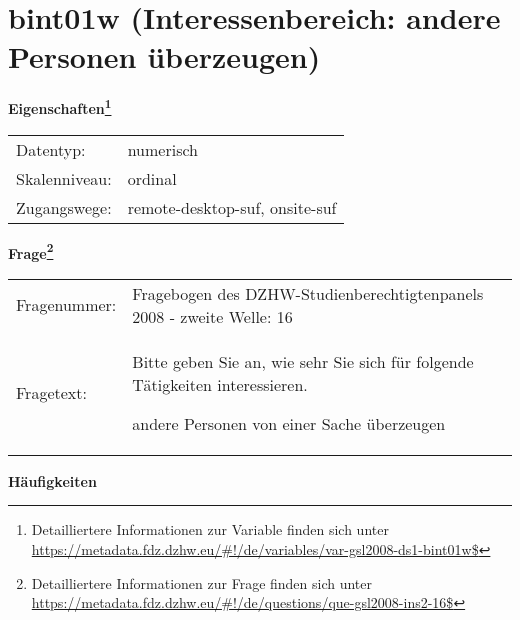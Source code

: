 
    \setcounter{footnote}{0}

    \vspace*{-1.8cm}
	\section{bint01w (Interessenbereich: andere Personen überzeugen)}
	\label{section:bint01w}



    \vspace*{0.5cm}
    \noindent\textbf{Eigenschaften\footnote{Detailliertere Informationen zur Variable finden sich unter
		\url{https://metadata.fdz.dzhw.eu/\#!/de/variables/var-gsl2008-ds1-bint01w$}}}\\
	\begin{tabularx}{\hsize}{@{}lX}
	Datentyp: & numerisch \\
	Skalenniveau: & ordinal \\
	Zugangswege: &
	  remote-desktop-suf, 
	  onsite-suf
 \\
    \end{tabularx}



				\vspace*{0.5cm}
                \noindent\textbf{Frage\footnote{Detailliertere Informationen zur Frage finden sich unter
		              \url{https://metadata.fdz.dzhw.eu/\#!/de/questions/que-gsl2008-ins2-16$}}}\\
				\begin{tabularx}{\hsize}{@{}lX}
					Fragenummer: &
					  Fragebogen des DZHW-Studienberechtigtenpanels 2008 - zweite Welle:
					  16
 \\
					Fragetext: & Bitte geben Sie an, wie sehr Sie sich für folgende Tätigkeiten interessieren.\par  andere Personen von einer Sache überzeugen \\
				\end{tabularx}





        		\vspace*{0.5cm}
                \noindent\textbf{Häufigkeiten}

